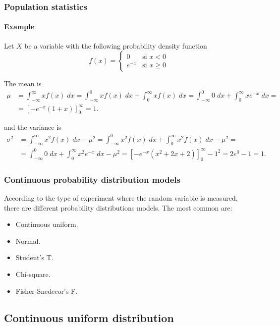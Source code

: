 \begin{frame}
\frametitle{Population statistics}
\framesubtitle{Example}
Let $X$ be a variable with the following probability density function
\[
f(x) =
\begin{cases}
0 & \mbox{si $x<0$}\\
e^{-x} & \mbox{si $x\geq 0$}
\end{cases}
\]

The mean is 
\begin{align*}
\mu &= \int_{-\infty}^\infty xf(x)\;dx = \int_{-\infty}^0 xf(x)\;dx +\int_0^\infty xf(x)\;dx = \int_{-\infty}^0 0\;dx +\int_0^\infty xe^{-x}\;dx =\\
&= \left[-e^{-x}(1+x)\right]_0^{\infty} = 1.
\end{align*}

and the variance is
\begin{align*}
\sigma^2 &= \int_{-\infty}^\infty x^2f(x)\;dx -\mu^2 = \int_{-\infty}^0 x^2f(x)\;dx +\int_0^\infty x^2f(x)\;dx -\mu^2 = \\
&= \int_{-\infty}^0 0\;dx +\int_0^\infty x^2e^{-x}\;dx -\mu^2= \left[-e^{-x}(x^2+2x+2)\right]_0^{\infty} - 1^2= 2e^0-1 = 1.
\end{align*}

\end{frame}



\begin{frame}
\frametitle{Continuous probability distribution models}
According to the type of experiment where the random variable is measured, there are different probability distributions models. 
The most common are:
\begin{itemize}
\item Continuous uniform.
\item Normal.
\item Student's T.
\item Chi-square.
\item Fisher-Snedecor's F.
\end{itemize}
\end{frame}


\subsection{Continuous uniform distribution}

